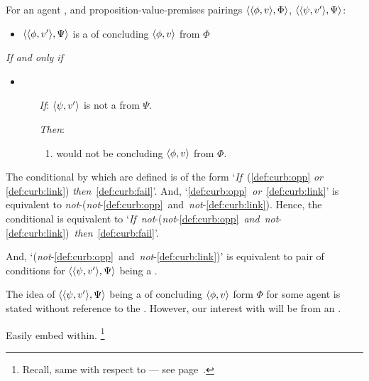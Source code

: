 \begin{note}
  \begin{proposition}
        For an agent \vAgent{}, and proposition-value-premises pairings \(\langle \langle \phi, v \rangle, \Phi \rangle\), \(\langle \langle \psi, v' \rangle, \Psi \rangle\):

    \begin{itemize}
    \item
      \(\langle \langle \phi, v' \rangle, \Psi \rangle\) is a \emph{\curb{}} of concluding \(\langle \phi, v \rangle\) from \(\Phi\)
    \end{itemize}

    \emph{If and only if}

    \begin{itemize}
    \item
        \begin{enumerate}
        \item[\emph{If}:]
          \(\langle \psi, v' \rangle\) is not a \fc{} from \(\Psi\).
        \item[\emph{Then}:]
          \begin{enumerate}[label=\alph*., ref=(\alph*), resume]
          \item
            \label{def:curb:fail}
            \vAgent{} would not be concluding \(\langle \phi, v \rangle\) from \(\Phi\).
          \end{enumerate}
      \end{enumerate}
    \end{itemize}
    \begin{argument}
      The conditional by which  are defined is of the form `\emph{If}~(\ref{def:curb:opp} \emph{or} \ref{def:curb:link}) \emph{then}~\ref{def:curb:fail}'.
      And, `\ref{def:curb:opp}~\emph{or}~\ref{def:curb:link}' is equivalent to \emph{not}-(\emph{not}-\ref{def:curb:opp}~and~\emph{not}-\ref{def:curb:link}).
      Hence, the conditional is equivalent to `\emph{If}~\emph{not}-(\emph{not}-\ref{def:curb:opp}~\emph{and}~\emph{not}-\ref{def:curb:link})~\emph{then}~\ref{def:curb:fail}'.

    And, `(\emph{not}-\ref{def:curb:opp}~and~\emph{not}-\ref{def:curb:link})' is equivalent to pair of conditions for \(\langle \langle \psi, v' \rangle, \Psi \rangle\) being a \fc{}.
    \end{argument}
  \end{proposition}
\end{note}

\begin{note}
  The idea of \(\langle \langle \psi, v' \rangle, \Psi \rangle\) being a  of concluding \(\langle \phi, v \rangle\) form \(\Phi\) for some agent is stated without reference to the \agpe{}.
  However, our interest with  will be from an \agpe{}.

  Easily embed within.%
  \footnote{
    Recall, same with respect to  --- see page~\pageref{fcs-neutral-perspective}.
  }
\end{note}


